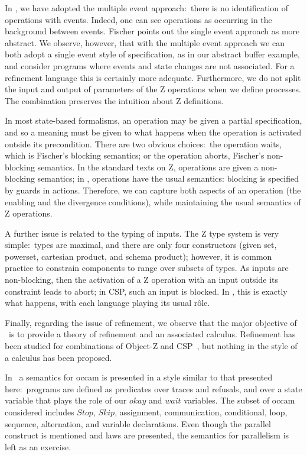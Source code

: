 \documentclass{article}
\begin{document}
In \Circus, we have adopted the multiple event approach:~there is no
identification of operations with events.  Indeed, one can see
operations as occurring in the background between events.  Fischer
points out the single event approach as more abstract.  We observe,
however, that with the multiple event approach we can both adopt a
single event style of specification, as in our abstract buffer
example, and consider programs where events and state changes are not
associated.  For a refinement language this is certainly more
adequate.  Furthermore, we do not split the input and output of
parameters of the Z operations when we define processes.  The
combination preserves the intuition about Z definitions.

In most state-based formalisms, an operation may be given a partial
specification, and so a meaning must be given to what happens when the
operation is activated outside its precondition.  There are two
obvious choices:~the operation waits, which is Fischer's blocking
semantics; or the operation aborts, Fischer's non-blocking semantics.
In the standard texts on Z, operations are given a non-blocking
semantics; in \Circus, operations have the usual semantics: blocking
is specified by guards in actions.  Therefore, we can capture both
aspects of an operation (the enabling and the divergence conditions),
while maintaining the usual semantics of Z operations.

A further issue is related to the typing of inputs.  The Z type system
is very simple:~types are maximal, and there are only four
constructors (given set, powerset, cartesian product, and schema
product); however, it is common practice to constrain components to
range over subsets of types.  As inputs are non-blocking, then the
activation of a Z operation with an input outside its constraint leads
to abort; in CSP, such an input is blocked.  In \Circus, this is
exactly what happens, with each language playing its usual r\^{o}le.

Finally, regarding the issue of refinement, we observe that the major
objective of \Circus\ is to provide a theory of refinement and an
associated calculus.  Refinement has been studied for combinations of
Object-Z and CSP~\cite{SD01}, but nothing in the style of a calculus
has been proposed.

In~\cite{HR84} a semantics for occam is presented in a style similar
to that presented here:~programs are defined as predicates over traces
and refusals, and over a state variable that plays the role of our
$okay$ and $wait$ variables.  The subset of occam considered includes
$Stop$, $Skip$, assignment, communication, conditional, loop,
sequence, alternation, and variable declarations.  Even though the
parallel construct is mentioned and laws are presented, the semantics
for parallelism is left as an exercise.
\end{document}
